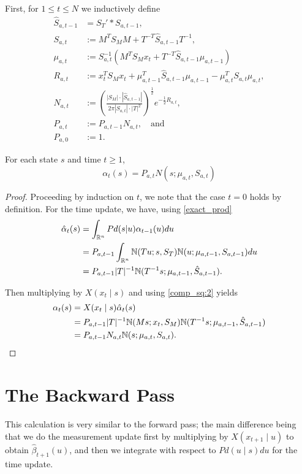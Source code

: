 \documentclass[12pt,leqno]{article}
\begin{document}
  First, for $1\le t \le N$ we inductively define
  \begin{align*}
    \hat{S}_{a,t-1} &= S_T'*S_{a,t-1},\\
    S_{a,t} &:= M^TS_MM  +T^{-T} \hat{S}_{a,t-1}T^{-1},\\
    \mu_{a,t} &:= S_{a,t}^{-1}(M^TS_Mx_t + T^{-T}\hat{S}_{a,t-1}\mu_{a,t-1})\\
    R_{a,t} &:= x_t^TS_Mx_t + \mu_{a,t-1}^T\hat{S}_{a,t-1}\mu_{a,t-1} - \mu_{a,t}^TS_{a,t}\mu_{a,t},\\
    N_{a,t} &:= \left(\frac{|S_M|\cdot|\hat{S}_{a,t-1}|}{2\pi|S_{a,t}|\cdot|T|^2}\right)^{\frac{1}{2}}e^{-\frac{1}{2}R_{a,t}},\\
    P_{a,t} &:= P_{a,t-1}N_{a,t}, \quad\text{and}\\
    P_{a,0} &:= 1.
  \end{align*}

\begin{Thm}\label{alpha:1}
  For each state $s$ and time $t \ge 1$,
$$
  \alpha_t(s) = P_{a,t}N(s;\mu_{a,t},S_{a,t})
$$
\end{Thm}

\begin{proof}

Proceeding by induction on $t$, we note that the case $t = 0$ holds by definition.
For the time update, we have, using \eqref{exact_prod}
\begin{align}
  \hat{\alpha}_t(s) &= \int_{{\mathbb R}^n}Pd(s|u)\alpha_{t-1}(u)du \\\notag
  &= P_{a,t-1}\int_{{\mathbb R}^n}{\mathbb N}(Tu;s,S_T){\mathbb N}(u;\mu_{a,t-1},S_{a,t-1})du \notag\\
  &= P_{a,t-1}|T|^{-1}{\mathbb N}(T^{-1}s;\mu_{a,t-1},\hat{S}_{a,t-1}).
\end{align}

Then multiplying by $X(x_t\mid s)$ and using \eqref{comp_sq:2} yields
\begin{align*}
  \alpha_t(s) &= X(x_t\mid s)\hat{\alpha}_t(s) \\
  &= P_{a,t-1}|T|^{-1}{\mathbb N}(Ms;x_t,S_M){\mathbb N}(T^{-1}s;\mu_{a,t-1},\hat{S}_{a,t-1}) \\
  &= P_{a,t-1}N_{a,t}{\mathbb N}(s;\mu_{a,t},S_{a,t}).
\end{align*}
\end{proof}

\section{The Backward Pass}
This calculation is very similar to the forward pass; the main difference being that we do
the measurement update first by multiplying by $X(x_{t+1}\mid u)$ to obtain $\hat{\beta}_{t+1}(u)$,
and then we integrate with respect to $Pd(u\mid s)du$ for the time update.  
\end{document}
